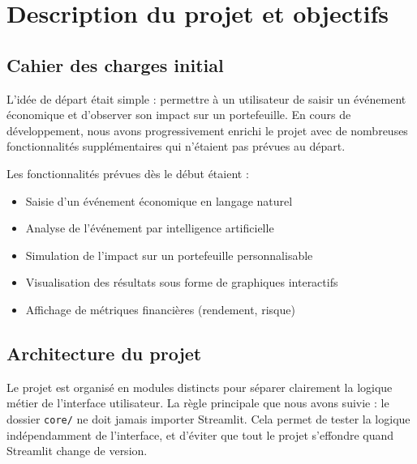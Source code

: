 \documentclass[a4paper, 12pt, twoside]{article}
\begin{document}
\newpage

\section{Description du projet et objectifs}

\subsection{Cahier des charges initial}

L'idée de départ était simple : permettre à un utilisateur de saisir un événement
économique et d'observer son impact sur un portefeuille. En cours de développement,
nous avons progressivement enrichi le projet avec de nombreuses fonctionnalités
supplémentaires qui n'étaient pas prévues au départ.

Les fonctionnalités prévues dès le début étaient :

\begin{itemize}
    \item Saisie d'un événement économique en langage naturel
    \item Analyse de l'événement par intelligence artificielle
    \item Simulation de l'impact sur un portefeuille personnalisable
    \item Visualisation des résultats sous forme de graphiques interactifs
    \item Affichage de métriques financières (rendement, risque)
\end{itemize}

\subsection{Architecture du projet}

Le projet est organisé en modules distincts pour séparer clairement la logique métier
de l'interface utilisateur. La règle principale que nous avons suivie : le dossier
\texttt{core/} ne doit jamais importer Streamlit. Cela permet de tester la logique
indépendamment de l'interface, et d'éviter que tout le projet s'effondre quand
Streamlit change de version.
\end{document}
